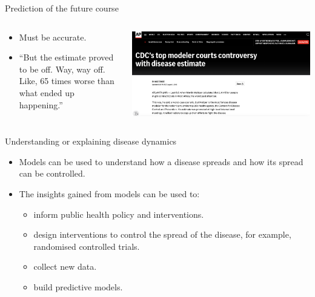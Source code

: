 \documentclass[
  ignorenonframetext,
]{beamer}
\providecommand{\tightlist}{%
  \setlength{\itemsep}{0pt}\setlength{\parskip}{0pt}}\usepackage{longtable,booktabs,array}
\begin{document}
\begin{frame}
\begin{block}{Prediction of the future course}
\label{prediction-of-the-future-course}
\begin{columns}[T]
\begin{column}{0.4\textwidth}
\begin{itemize}
\tightlist
\item
  Must be {accurate}.
\item
  ``But the estimate proved to be off. Way, way off. Like, 65 times
  worse than what ended up happening.''
\end{itemize}
\end{column}

\begin{column}{0.6\textwidth}
\includegraphics{images/wrong_ebola_deaths_estimate.png}
\end{column}
\end{columns}
\end{block}
\end{frame}

\begin{frame}
\begin{block}{Understanding or explaining disease dynamics}
\label{understanding-or-explaining-disease-dynamics}
\begin{itemize}
\tightlist
\item
  Models can be used to understand how a disease spreads and how its
  spread can be controlled.
\item
  The insights gained from models can be used to:

  \begin{itemize}
  \tightlist
  \item
    inform public health policy and interventions.
  \item
    design interventions to control the spread of the disease, for
    example, randomised controlled trials.
  \item
    collect new data.
  \item
    build predictive models.
  \end{itemize}
\end{itemize}
\end{block}
\end{frame}
\end{document}

